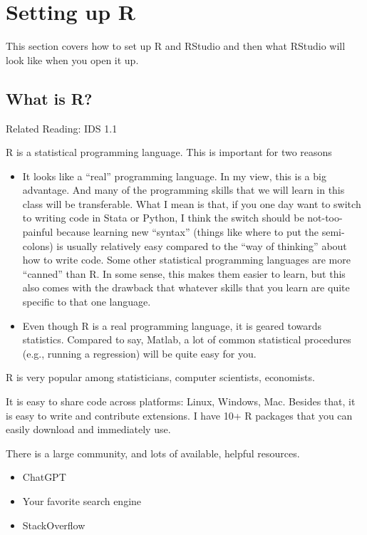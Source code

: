 \documentclass[
  letterpaper,
  DIV=11,
  numbers=noendperiod]{scrreprt}
\begin{document}
\section{Setting up R}\label{setting-up-r}

This section covers how to set up R and RStudio and then what RStudio
will look like when you open it up.

\subsection{What is R?}\label{what-is-r}

Related Reading: IDS 1.1

R is a statistical programming language. This is important for two
reasons

\begin{itemize}
\item
  It looks like a ``real'' programming language. In my view, this is a
  big advantage. And many of the programming skills that we will learn
  in this class will be transferable. What I mean is that, if you one
  day want to switch to writing code in Stata or Python, I think the
  switch should be not-too-painful because learning new ``syntax''
  (things like where to put the semi-colons) is usually relatively easy
  compared to the ``way of thinking'' about how to write code. Some
  other statistical programming languages are more ``canned'' than R. In
  some sense, this makes them easier to learn, but this also comes with
  the drawback that whatever skills that you learn are quite specific to
  that one language.
\item
  Even though R is a real programming language, it is geared towards
  statistics. Compared to say, Matlab, a lot of common statistical
  procedures (e.g., running a regression) will be quite easy for you.
\end{itemize}

R is very popular among statisticians, computer scientists, economists.

It is easy to share code across platforms: Linux, Windows, Mac. Besides
that, it is easy to write and contribute extensions. I have 10+ R
packages that you can easily download and immediately use.

There is a large community, and lots of available, helpful resources.

\begin{itemize}
\item
  ChatGPT
\item
  Your favorite search engine
\item
  StackOverflow
\end{itemize}
\end{document}
